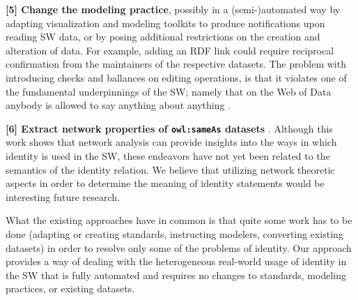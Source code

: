 \textbf{[5] Change the modeling practice}, possibly in a (semi-)automated way
  by adapting visualization and modeling toolkits to produce notifications
  upon reading SW data, or by posing additional restrictions on the creation
  and alteration of data. For example, adding an RDF link could require
  reciprocal confirmation from the maintainers of the respective datasets.
  \cite{HalpinHayes2010,DingShinavierFininMcguinness2010}
The problem with introducing checks and ballances on editing operations,
  is that it violates one of the fundamental underpinnings of the SW;
  namely that on the Web of Data anybody is allowed to say
  anything about anything \cite{AntoniouGrothHarmelenHoekstra2012}.

\textbf{[6] Extract network properties of {\small \texttt{owl:sameAs}}
  datasets} \cite{DingShinavierShangguanMcguinness2010}.
Although this work shows that network analysis can provide insights
  into the ways in which identity is used in the SW,
  these endeavors have not yet been related to the semantics of the
  identity relation.
We believe that utilizing network theoretic aspects in order to
  determine the meaning of identity statements
  would be interesting future research.

What the existing approaches have in common is
  that quite some work has to be done
  (adapting or creating standards, instructing modelers, converting existing
  datasets) in order to resolve only some of the problems of identity.
Our approach provides a way of dealing with the heterogeneous real-world
  usage of identity in the SW that is fully automated and requires
  no changes to standards, modeling practices, or existing datasets.
